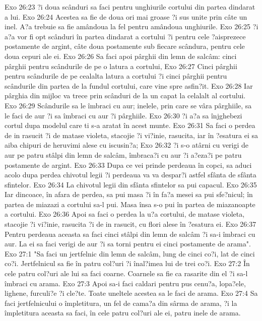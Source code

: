 Exo 26:23  ?i doua scânduri sa faci pentru unghiurile cortului din partea dindarat a lui.
Exo 26:24  Acestea sa fie de doua ori mai groase ?i sus unite prin câte un inel. A?a trebuie sa fie amândoua la fel pentru amândoua unghiurile.
Exo 26:25  ?i a?a vor fi opt scânduri în partea dindarat a cortului ?i pentru cele ?aisprezece postamente de argint, câte doua postamente sub fiecare scândura, pentru cele doua cepuri ale ei.
Exo 26:26  Sa faci apoi pârghii din lemn de salcâm: cinci pârghii pentru scândurile de pe o latura a cortului,
Exo 26:27  Cinci pârghii pentru scândurile de pe cealalta latura a cortului ?i cinci pârghii pentru scândurile din partea de la fundul cortului, care vine spre asfin?it.
Exo 26:28  Iar pârghia din mijloc va trece prin scânduri de la un capat la celalalt al cortului.
Exo 26:29  Scândurile sa le îmbraci cu aur; inelele, prin care se vâra pârghiile, sa le faci de aur ?i sa îmbraci cu aur ?i pârghiile.
Exo 26:30  ?i a?a sa înjghebezi cortul dupa modelul care ti s-a aratat în acest munte.
Exo 26:31  Sa faci o perdea de in rasucit ?i de matase violeta, stacojie ?i vi?inie, rasucita, iar în ?esatura ei sa aiba chipuri de heruvimi alese cu iscusin?a;
Exo 26:32  ?i s-o atârni cu verigi de aur pe patru stâlpi din lemn de salcâm, îmbraca?i cu aur ?i a?eza?i pe patru postamente de argint.
Exo 26:33  Dupa ce vei prinde perdeaua în copci, sa aduci acolo dupa perdea chivotul legii ?i perdeaua va va despar?i astfel sfânta de sfânta sfintelor.
Exo 26:34  La chivotul legii din sfânta sfintelor sa pui capacul.
Exo 26:35  Iar dincoace, în afara de perdea, sa pui masa ?i în fa?a mesei sa pui sfe?nicul; în partea de miazazi a cortului sa-l pui. Masa însa s-o pui în partea de miazanoapte a cortului.
Exo 26:36  Apoi sa faci o perdea la u?a cortului, de matase violeta, stacojie ?i vi?inie, rasucita ?i de in rasucit, cu flori alese în ?esatura ei.
Exo 26:37  Pentru perdeaua aceasta sa faci cinci stâlpi din lemn de salcâm ?i sa-i îmbraci cu aur. La ei sa faci verigi de aur ?i sa torni pentru ei cinci postamente de arama".
Exo 27:1  "Sa faci un jertfelnic din lemn de salcâm, lung de cinci co?i, lat de cinci co?i. Jertfelnicul sa fie în patru col?uri ?i înal?imea lui de trei co?i.
Exo 27:2  În cele patru col?uri ale lui sa faci coarne. Coarnele sa fie ca rasarite din el ?i sa-l îmbraci cu arama.
Exo 27:3  Apoi sa-i faci caldari pentru pus cenu?a, lopa?ele, lighene, furculi?e ?i cle?te. Toate uneltele acestea sa le faci de arama.
Exo 27:4  Sa faci jertfelnicului o împletitura, un fel de cama?a din sârma de arama, ?i la împletitura aceasta sa faci, în cele patru col?uri ale ei, patru inele de arama.
